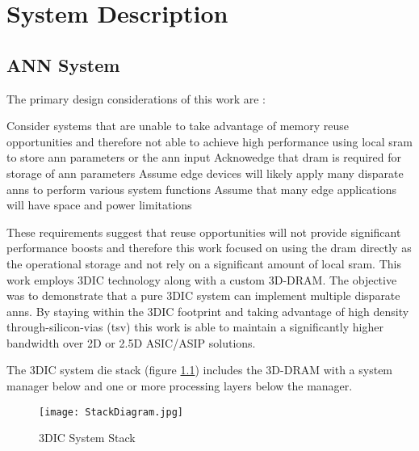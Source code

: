 

\chapter{System Description}
\label{chap-two}

\section{ANN System}
\label{sec:ANN System}

The primary design considerations of this work are :
\begin{outline}
  \1 Consider systems that are unable to take advantage of memory reuse opportunities and therefore not able to achieve high performance using local \ac{sram} to store \ac{ann} parameters or the \ac{ann} input 
  \1 Acknowedge that \ac{dram} is required for storage of \ac{ann} parameters 
  \1 Assume edge devices will likely apply many disparate \ac{ann}s to perform various system functions
  \1 Assume that many edge applications will have space and power limitations
\end{outline}

These requirements suggest that reuse opportunities will not provide significant performance boosts and therefore this work focused on using the \ac{dram} directly as the operational
storage and not rely on a significant amount of local \ac{sram}.
This work employs 3DIC technology along with a custom 3D-DRAM. The objective was to demonstrate that a pure 3DIC system can implement multiple disparate \ac{ann}s. By staying within the 3DIC footprint and taking advantage of high
density through-silicon-vias (\ac{tsv}) this work is able to maintain a significantly higher bandwidth over 2D or 2.5D ASIC/ASIP solutions.

The 3DIC system die stack (figure \ref{fig:3DICStack}) includes the 3D-DRAM with a system manager below and one or more processing layers below the manager.
\begin{figure}[!t]
\centering
\captionsetup{justification=centering}
\captionsetup{width=.9\linewidth}
\centerline{
\mbox{\texttt{[image: StackDiagram.jpg]}}
}
\caption{3DIC System Stack}
\label{fig:3DICStack}
\end{figure}

